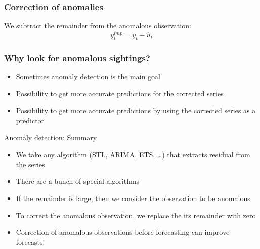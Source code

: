 \begin{frame}
	\frametitle{Correction of anomalies}
	
	\pause
	We subtract the remainder from the anomalous observation:
	\[
	y_t^{imp} = y_t - \hat u_t
	\]
	
\end{frame}



\begin{frame}
	\frametitle{Why look for anomalous sightings?}
	
	\begin{itemize}[<+->]
		\item Sometimes anomaly detection is the \alert{main goal}
		\item Possibility to get \alert{more accurate} predictions for the corrected series
		\item Possibility to get \alert{more accurate} predictions by using the corrected series as a predictor
	\end{itemize}
	
	
\end{frame}



\begin{frame}{Anomaly detection: Summary}
	
	\begin{itemize}[<+->]
		\item We take any algorithm (STL, ARIMA, ETS, \ldots) that extracts \alert{residual} from the series
		\item There are \alert{a bunch} of special algorithms
		\item If the remainder \alert{is large}, then we consider the observation to be anomalous
		\item To correct the anomalous observation, we replace the its remainder with  \alert{zero}
		\item \alert{Correction} of anomalous observations before forecasting can improve forecasts!
	\end{itemize}
\end{frame}